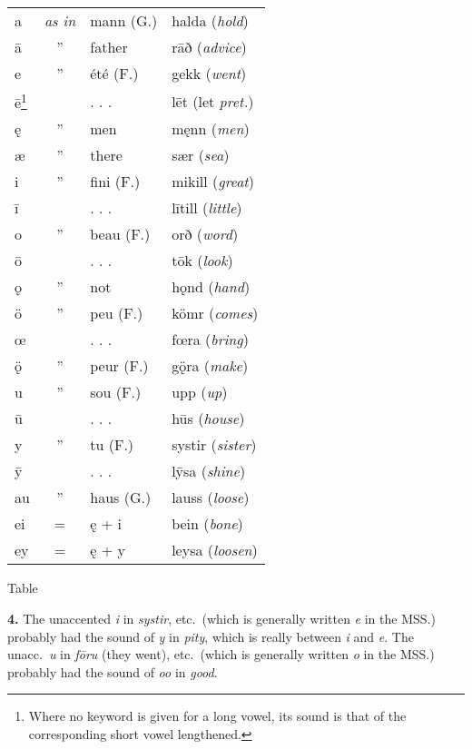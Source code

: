 \documentclass[12pt,letterpaper]{book}
\newcommand\newcaption{\small\refstepcounter{table}%
	\centering Table~\thetable}
\begin{document}
\begin{table}[htbp]
\begin{center}
\begin{minipage}{3in}
\begin{tabular}{lcll}
	a & \textit{as in} & mann (G.) & halda (\textit{hold})\\
	ā & '' & father & rāð (\textit{advice})\\
	e & '' & été (F.) & gekk (\textit{went})\\
	ē\protect\footnote{Where no keyword is given for a long vowel, its sound is
		that of the corresponding short vowel lengthened.} & & . . . & lēt (let
		\textit{pret.})\\
	ę & '' & men & męnn (\textit{men})\\
	æ & '' & there & sær (\textit{sea})\\
	i & '' & fini (F.) & mikill (\textit{great})\\
	ī & & . . . & lītill (\textit{little}) \\
	o & '' & beau (F.) & orð (\textit{word})\\
	ō & & . . . & tōk (\textit{look})\\
	ǫ & '' & not & hǫnd (\textit{hand})\\
	ö & '' & peu (F.) & kömr (\textit{comes})\\
	œ & & . . . & fœra (\textit{bring})\\
	ǫ̈ & '' & peur (F.) & gǫ̈ra (\textit{make})\\
	u & '' & sou (F.) & upp (\textit{up})\\
	ū & & . . . & hūs (\textit{house})\\
	y & '' & tu (F.) & systir (\textit{sister})\\
	ȳ & & . . . & lȳsa (\textit{shine})\\
	au & '' & haus (G.) & lauss (\textit{loose})\\
	ei & = & ę + i & bein (\textit{bone})\\
	ey & = & ę + y & leysa (\textit{loosen})\\
\end{tabular}
\end{minipage}
\end{center}
\newcaption
\label{tab:3}
\end{table}

\textbf{4.} The unaccented \textit{i} in \textit{systir}, etc.\ (which is generally
written \textit{e} in the MSS.) probably had the sound of \textit{y} in
\textit{pity}, which is really between \textit{i} and \textit{e}.  The
unacc.\ \textit{u} in \textit{fōru} (they went), etc.\ (which is generally written
\textit{o} in the MSS.) probably had the sound of \textit{oo} in \textit{good}.
\end{document}
